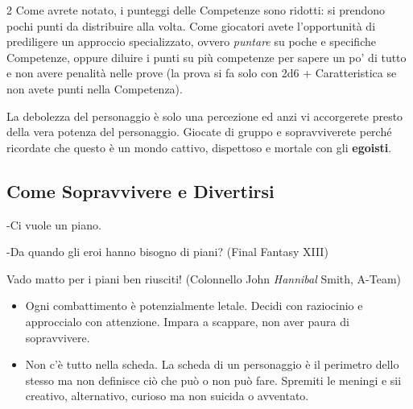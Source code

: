 \begin{multicols}{2}
Come avrete notato, i punteggi delle Competenze sono ridotti: si prendono pochi punti da distribuire alla volta.
Come giocatori avete l'opportunità di prediligere un approccio specializzato, ovvero \emph{puntare} su poche e specifiche Competenze, oppure diluire i punti su più competenze per sapere un po' di tutto e non avere penalità nelle prove (la prova si fa solo con 2d6 + Caratteristica se non avete punti nella Competenza).


\begin{giocatore}[Potere]
La debolezza del personaggio è solo una percezione ed anzi vi accorgerete presto della vera potenza del personaggio. Giocate di gruppo e sopravviverete perché ricordate che questo è un mondo cattivo, dispettoso e mortale con gli \textbf{egoisti}.
\end{giocatore}


\subsection{Come Sopravvivere e Divertirsi}\label{suggerimentigiocatori}

\begin{enfasi}{
-\noindent Ci vuole un piano.

-\noindent Da quando gli eroi hanno bisogno di piani? (Final Fantasy XIII)

\medskip

Vado matto per i piani ben riusciti! (Colonnello John \emph{Hannibal} Smith, A-Team)}
\end{enfasi}\medskip

\begin{itemize}[leftmargin=*] \setlength{\itemsep}{0pt}

\item
Ogni combattimento è potenzialmente letale. Decidi con raziocinio e approccialo con attenzione. Impara a scappare, non aver paura di sopravvivere.

\item
Non c'è tutto nella scheda. La scheda di un personaggio è il perimetro dello stesso ma non definisce ciò che può o non può fare. Spremiti le meningi e sii creativo, alternativo, curioso ma non suicida o avventato.


\end{itemize}
\end{multicols}
